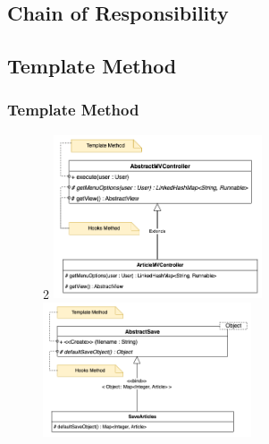 \subsection{Chain of Responsibility}


\subsection{Template Method}
\begin{frame}
    \frametitle{Template Method}
    \begin{figure}
        \begin{multicols} {2}
            \includegraphics[width=0.55\textwidth]{img/templateMethodController.png}
            \columnbreak
            \includegraphics[width=0.55\textwidth]{img/templateMethodSave.png}
        \end{multicols}
    \end{figure}
\end{frame}

